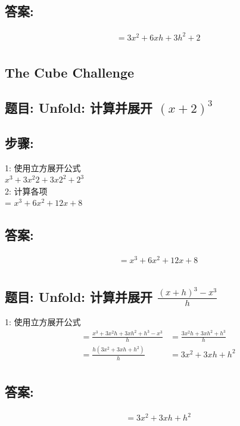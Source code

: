 \documentclass[12pt]{article}
\begin{document}
\subsection*{答案:} 
\begin{align*}
&= 3x^{2} + 6xh + 3h^{2} + 2 \\
\end{align*}

\subsection*{The Cube Challenge}
\subsection*{题目: Unfold:  计算并展开 $(x+2)^{3}$}
\subsection*{步骤:}
1: 使用立方展开公式 \\
$x^{3} + 3x^{2}2 + 3x2^{2} + 2^{3}$ \\
2: 计算各项 \\
= $x^{3} + 6x^{2} + 12x + 8$ \\
\subsection*{答案:}
\begin{align*}
    & = x^{3} +6x^{2} + 12x + 8 \\
\end{align*}

\subsection*{题目: Unfold:  计算并展开 $\frac{(x+h)^{3}-x^{3}}{h}$}
1: 使用立方展开公式 \\
\begin{align*}
&= \frac{x^{3} + 3x^{2}h  + 3xh^{2} + h^3 - x^{3}}{h}
&= \frac{3x^{2}h  + 3xh^{2} + h^3}{h} \\ 
&= \frac{h(3x^{2} + 3xh  + h^{2})}{h}
& = 3x^{2} + 3xh  + h^{2} \\
\end{align*}
\subsection*{答案:}
\begin{align*}
   & = 3x^{2} + 3xh  + h^{2} \\
\end{align*}
\end{document}
